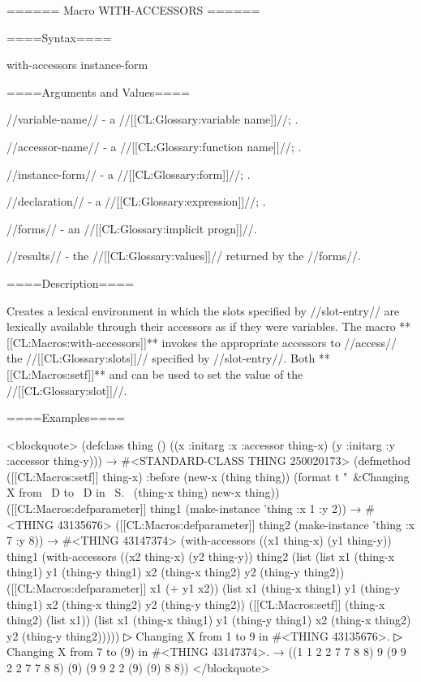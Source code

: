 ====== Macro WITH-ACCESSORS ======


====Syntax====

\DefmacWithValuesNewline with-accessors {{} instance-form  } {}


====Arguments and Values====

//variable-name// - a //[[CL:Glossary:variable name]]//; \noeval.

//accessor-name// - a //[[CL:Glossary:function name]]//; \noeval.

//instance-form// - a //[[CL:Glossary:form]]//; \eval.

//declaration// - a  //[[CL:Glossary:expression]]//; \noeval.

//forms// - an //[[CL:Glossary:implicit progn]]//.

//results// - the //[[CL:Glossary:values]]// returned by the //forms//.

====Description====

Creates a lexical environment in which the slots specified by //slot-entry// are lexically available through their accessors as if they were variables. The macro **[[CL:Macros:with-accessors]]** invokes the appropriate accessors to //access// the //[[CL:Glossary:slots]]// specified by //slot-entry//. Both **[[CL:Macros:setf]]** and  can be used to set the value of the //[[CL:Glossary:slot]]//.

====Examples====

<blockquote> (defclass thing () ((x :initarg :x :accessor thing-x) (y :initarg :y :accessor thing-y))) → #<STANDARD-CLASS THING 250020173> (defmethod ([[CL:Macros:setf]] thing-x) :before (new-x (thing thing)) (format t "~&Changing X from ~D to ~D in ~S.~ (thing-x thing) new-x thing)) ([[CL:Macros:defparameter]] thing1 (make-instance 'thing :x 1 :y 2)) → #<THING 43135676> ([[CL:Macros:defparameter]] thing2 (make-instance 'thing :x 7 :y 8)) → #<THING 43147374> (with-accessors ((x1 thing-x) (y1 thing-y)) thing1 (with-accessors ((x2 thing-x) (y2 thing-y)) thing2 (list (list x1 (thing-x thing1) y1 (thing-y thing1) x2 (thing-x thing2) y2 (thing-y thing2)) ([[CL:Macros:defparameter]] x1 (+ y1 x2)) (list x1 (thing-x thing1) y1 (thing-y thing1) x2 (thing-x thing2) y2 (thing-y thing2)) ([[CL:Macros:setf]] (thing-x thing2) (list x1)) (list x1 (thing-x thing1) y1 (thing-y thing1) x2 (thing-x thing2) y2 (thing-y thing2)))))
▷ Changing X from 1 to 9 in #<THING 43135676>.
▷ Changing X from 7 to (9) in #<THING 43147374>. → ((1 1 2 2 7 7 8 8) 9 (9 9 2 2 7 7 8 8) (9) (9 9 2 2 (9) (9) 8 8)) </blockquote>

